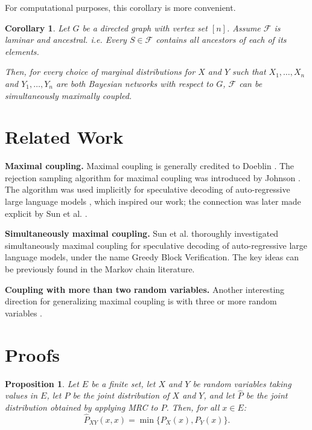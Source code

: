 \documentclass{article}
\newtheorem{proposition}{Proposition}
\newtheorem{corollary}{Corollary}
\newcommand{\F}{\mathcal{F}}
\newcommand{\mrc}{MRC\xspace}
\begin{document}
For computational purposes, this corollary is more convenient.

\begin{corollary}
Let $G$ be a directed graph with vertex set $[n]$.
Assume $\F$ is laminar and ancestral.
i.e. Every $S \in \F$ contains all ancestors of each of its elements.

Then, for every choice of marginal distributions for $X$ and $Y$
such that $X_1, \dots, X_n$ and
$Y_1, \dots, Y_n$ are both Bayesian networks with respect to $G$,
$\F$ can be simultaneously maximally coupled.
\end{corollary}

\section{Related Work}

\textbf{Maximal coupling.}
Maximal coupling is generally credited to Doeblin \cite{lindvall1991w}.
The rejection sampling algorithm for maximal coupling was introduced by Johnson \cite{johnson1998coupling}.
The algorithm was used implicitly for speculative decoding of auto-regressive large language models \cite{leviathan2023fast},
which inspired our work;
the connection was later made explicit by Sun et al. \cite{sun2024spectr}.

\textbf{Simultaneously maximal coupling.}
Sun et al. \cite{sun2024blockverificationacceleratesspeculative_v2}
thoroughly investigated simultaneously maximal coupling for speculative decoding
of auto-regres\-sive large language models,
under the name Greedy Block Verification.
The key ideas can be previously found in the Markov chain literature.

\textbf{Coupling with more than two random variables.}
Another interesting direction for generalizing maximal coupling
is with three or more random variables \cite{angel2021pairwiseoptimalcouplingmultiple}.

\printbibliography

\newpage
\appendix
\section{Proofs} \label{sec:proofs}

\begin{proposition}
    Let $E$ be a finite set, let $X$ and $Y$ be random variables taking values in $E$, 
    let $P$ be the joint distribution of $X$ and $Y$, and let $\hat{P}$ be the joint distribution obtained 
    by applying \mrc to $P$. Then, for all $x \in E$:
    \[
    \hat{P}_{XY}(x,x) = \min \{ P_X(x), P_Y(x) \}.
    \]
\end{proposition}
\end{document}

